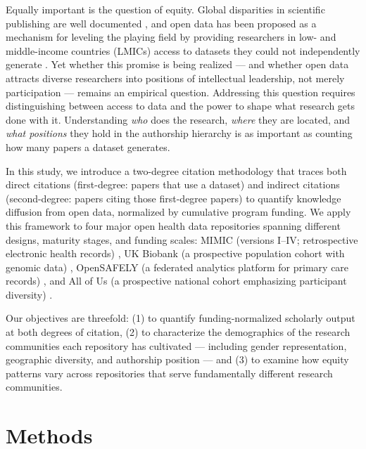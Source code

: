 \documentclass[11pt]{article}
\begin{document}
Equally important is the question of equity.
Global disparities in scientific publishing are well documented \cite{lariviere2013bibliometrics}, and open data has been proposed as a mechanism for leveling the playing field by providing researchers in low- and middle-income countries (LMICs) access to datasets they could not independently generate \cite{celi2022sources}.
Yet whether this promise is being realized --- and whether open data attracts diverse researchers into positions of intellectual leadership, not merely participation --- remains an empirical question.
Addressing this question requires distinguishing between access to data and the power to shape what research gets done with it.
Understanding \textit{who} does the research, \textit{where} they are located, and \textit{what positions} they hold in the authorship hierarchy is as important as counting how many papers a dataset generates.

In this study, we introduce a two-degree citation methodology that traces both direct citations (first-degree: papers that use a dataset) and indirect citations (second-degree: papers citing those first-degree papers) to quantify knowledge diffusion from open data, normalized by cumulative program funding.
We apply this framework to four major open health data repositories spanning different designs, maturity stages, and funding scales: MIMIC (versions I--IV; retrospective electronic health records) \cite{johnson2016mimic,johnson2023mimic}, UK Biobank (a prospective population cohort with genomic data) \cite{sudlow2015ukbiobank,bycroft2018ukbiobank}, OpenSAFELY (a federated analytics platform for primary care records) \cite{williamson2020opensafely}, and All of Us (a prospective national cohort emphasizing participant diversity) \cite{allofus2019,haendel2021nhgri}.

Our objectives are threefold: (1) to quantify funding-normalized scholarly output at both degrees of citation, (2) to characterize the demographics of the research communities each repository has cultivated --- including gender representation, geographic diversity, and authorship position --- and (3) to examine how equity patterns vary across repositories that serve fundamentally different research communities.


\section{Methods}
\label{sec:methods}
\end{document}

